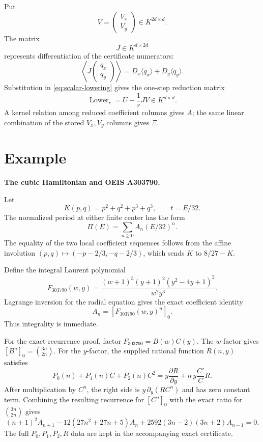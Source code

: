 \documentclass[11pt]{article}
\newcommand{\Dx}{D_x}
\newcommand{\Dy}{D_y}
\begin{document}
Put
\[
  V=\begin{pmatrix}V_x\\V_y\end{pmatrix}\in K^{2d\times d}.
\]
The matrix
\[
  J\in K^{d\times2d}
\]
represents differentiation of the certificate numerators:
\[
  \left\langle J
  \begin{pmatrix}q_x\\q_y\end{pmatrix}\right\rangle
  =\Dx\langle q_x\rangle+\Dy\langle q_y\rangle.
\]
Substitution in \eqref{eq:scalar-lowering} gives the one-step reduction
matrix
\begin{equation}\label{eq:Lower}
  \operatorname{Lower}_r=U-\frac1rJV\in K^{d\times d}.
\end{equation}
A kernel relation among reduced coefficient columns gives $A$; the same
linear combination of the stored $V_x,V_y$ columns gives $\Xi$.

\section{Example}

\textbf{The cubic Hamiltonian and OEIS A303790.}

Let
\begin{equation}\label{eq:A303790-K}
  K(p,q)=p^2+q^2+p^3+q^3,
  \qquad t=E/32.
\end{equation}
The normalized period at either finite center has the form
\[
  \Pi(E)=\sum_{n\ge0}A_n(E/32)^n.
\]
The equality of the two local coefficient sequences follows from the affine
involution $(p,q)\mapsto(-p-2/3,-q-2/3)$, which sends $K$ to $8/27-K$.

Define the integral Laurent polynomial
\begin{equation}\label{eq:A303790-F}
  F_{303790}(w,y)=
  \frac{(w+1)^3(y+1)^2(y^2-4y+1)^2}{w^2y^3}.
\end{equation}
Lagrange inversion for the radial equation gives the exact coefficient
identity
\begin{equation}\label{eq:A303790-CT}
  A_n=[F_{303790}(w,y)^n]_0.
\end{equation}
Thus integrality is immediate.

For the exact recurrence proof, factor $F_{303790}=B(w)C(y)$.  The
$w$-factor gives $[B^n]_0=\binom{3n}{2n}$.  For the $y$-factor, the supplied
rational function $R(n,y)$ satisfies
\begin{equation}\label{eq:A303790-R}
  P_0(n)+P_1(n)C+P_2(n)C^2
  =y\frac{\partial R}{\partial y}
   +n\,y\frac{C'}{C}R.
\end{equation}
After multiplication by $C^n$, the right side is
$y\,\partial_y(RC^n)$ and has zero constant term.  Combining the resulting
recurrence for $[C^n]_0$ with the exact ratio for $\binom{3n}{2n}$ gives
\begin{equation}\label{eq:A303790-recurrence}
  (n+1)^2A_{n+1}
  -12(27n^2+27n+5)A_n
  +2592(3n-2)(3n+2)A_{n-1}=0.
\end{equation}
The full $P_0,P_1,P_2,R$ data are kept in the accompanying exact certificate.
\end{document}
